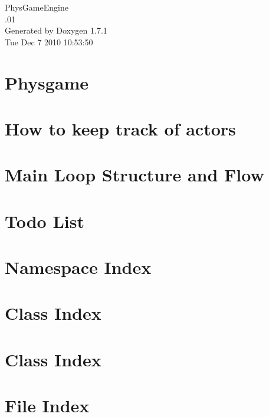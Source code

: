 \documentclass[a4paper]{book}
\begin{document}
\hypersetup{pageanchor=false}
\begin{titlepage}
\vspace*{7cm}
\begin{center}
{\Large PhysGameEngine \\[1ex]\large .01 }\\
\vspace*{1cm}
{\large Generated by Doxygen 1.7.1}\\
\vspace*{0.5cm}
{\small Tue Dec 7 2010 10:53:50}\\
\end{center}
\end{titlepage}
\clearemptydoublepage
{}
\tableofcontents
\clearemptydoublepage
{}
\hypersetup{pageanchor=true}
\chapter{Physgame}
\label{index}\hypertarget{index}{}
\chapter{How to keep track of actors}
\label{actorcontainer1}
\hypertarget{actorcontainer1}{}

\chapter{Main Loop Structure and Flow}
\label{mainloop1}
\hypertarget{mainloop1}{}

\chapter{Todo List}
\label{todo}
\hypertarget{todo}{}

\chapter{Namespace Index}

\chapter{Class Index}

\chapter{Class Index}

\chapter{File Index}

\end{document}
